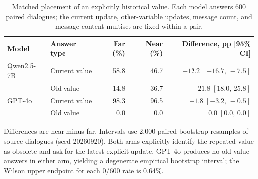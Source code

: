 \begin{table}[htbp]
\centering
\small
\setlength{\tabcolsep}{5pt}
\caption{Matched placement of an explicitly historical value. Each model answers 600 paired dialogues; the current update, other-variable updates, message count, and message-content multiset are fixed within a pair.}
\label{tab:revision-cicm-placement}
\begin{tabularx}{\textwidth}{@{}lXrrr@{}}
\toprule
Model & Answer type & Far (\%) & Near (\%) & Difference, pp [95\% CI] \\
\midrule
Qwen2.5-7B & Current value & 58.8 & 46.7 & $-12.2\;[-16.7,\,-7.5]$ \\
 & Old value & 14.8 & 36.7 & $+21.8\;[18.0,\,25.8]$ \\
\addlinespace
GPT-4o & Current value & 98.3 & 96.5 & $-1.8\;[-3.2,\,-0.5]$ \\
 & Old value & 0.0 & 0.0 & $0.0\;[0.0,\,0.0]$ \\
\bottomrule
\end{tabularx}
\vspace{3pt}\parbox{\linewidth}{\footnotesize Differences are near minus far. Intervals use 2,000 paired bootstrap resamples of source dialogues (seed 20260920). Both arms explicitly identify the repeated value as obsolete and ask for the latest explicit update. GPT-4o produces no old-value answers in either arm, yielding a degenerate empirical bootstrap interval; the Wilson upper endpoint for each 0/600 rate is 0.64\%.}
\end{table}
